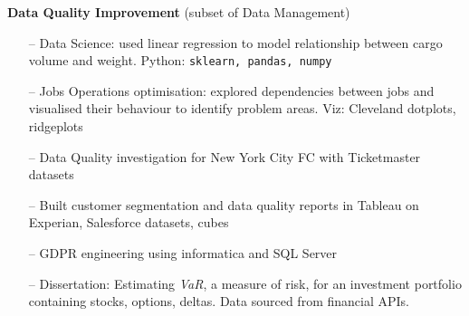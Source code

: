 \documentclass[10pt,a4paper]{altacv}
\begin{document}
\textbf{Data Quality Improvement} (subset of Data Management)
\begin{itemize}
  \item[--]   \small{Data Science: used linear regression to model relationship between cargo volume and weight.  Python: \texttt{sklearn, pandas, numpy}} 
  \item[--]   \small{Jobs Operations optimisation: explored dependencies between jobs and visualised their behaviour to identify problem areas. Viz: Cleveland dotplots, ridgeplots}

\end{itemize}


\medskip



\begin{itemize}
    \setlength{\itemindent}{0.5em}
    \item[--]   \small{Data Quality investigation for New York City FC with Ticketmaster datasets}
    \item[--]   \small{Built customer segmentation and data quality reports in Tableau on Experian, Salesforce datasets, cubes}
    \item[--]   \small{GDPR engineering using informatica and SQL Server}
\end{itemize}

\medskip



\begin{itemize}
  \item[--]   \small{Dissertation: Estimating \textit{VaR}, a measure of risk, for an investment portfolio containing stocks, options, deltas. Data sourced from financial APIs.}
\end{itemize}
\end{document}
